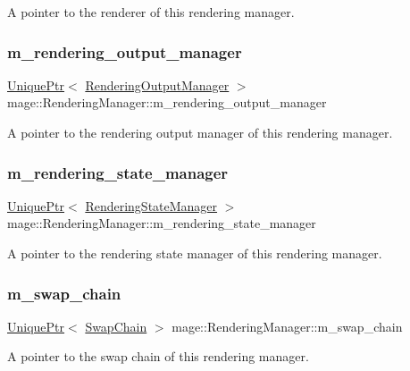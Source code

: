 A pointer to the renderer of this rendering manager. \hypertarget{classmage_1_1_rendering_manager_a305697e04c779ea637c1e11ae9065a69}{}\label{classmage_1_1_rendering_manager_a305697e04c779ea637c1e11ae9065a69} 
\subsubsection{\texorpdfstring{m\+\_\+rendering\+\_\+output\+\_\+manager}{m\_rendering\_output\_manager}}
{\footnotesize\ttfamily \hyperlink{namespacemage_a3316d7143a973e37adf1110f2e80ca31}{Unique\+Ptr}$<$ \hyperlink{classmage_1_1_rendering_output_manager}{Rendering\+Output\+Manager} $>$ mage\+::\+Rendering\+Manager\+::m\+\_\+rendering\+\_\+output\+\_\+manager\hspace{0.3cm}{\ttfamily [private]}}

A pointer to the rendering output manager of this rendering manager. \hypertarget{classmage_1_1_rendering_manager_aa31eab8068bf43e3b90f72644495c16a}{}\label{classmage_1_1_rendering_manager_aa31eab8068bf43e3b90f72644495c16a} 
\subsubsection{\texorpdfstring{m\+\_\+rendering\+\_\+state\+\_\+manager}{m\_rendering\_state\_manager}}
{\footnotesize\ttfamily \hyperlink{namespacemage_a3316d7143a973e37adf1110f2e80ca31}{Unique\+Ptr}$<$ \hyperlink{classmage_1_1_rendering_state_manager}{Rendering\+State\+Manager} $>$ mage\+::\+Rendering\+Manager\+::m\+\_\+rendering\+\_\+state\+\_\+manager\hspace{0.3cm}{\ttfamily [private]}}

A pointer to the rendering state manager of this rendering manager. \hypertarget{classmage_1_1_rendering_manager_acec25677bd92ddca6cb18efc1ed5fb38}{}\label{classmage_1_1_rendering_manager_acec25677bd92ddca6cb18efc1ed5fb38} 
\subsubsection{\texorpdfstring{m\+\_\+swap\+\_\+chain}{m\_swap\_chain}}
{\footnotesize\ttfamily \hyperlink{namespacemage_a3316d7143a973e37adf1110f2e80ca31}{Unique\+Ptr}$<$ \hyperlink{classmage_1_1_swap_chain}{Swap\+Chain} $>$ mage\+::\+Rendering\+Manager\+::m\+\_\+swap\+\_\+chain\hspace{0.3cm}{\ttfamily [private]}}

A pointer to the swap chain of this rendering manager. 